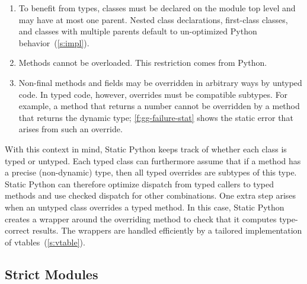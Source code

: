 \documentclass[english,cleveref,submission]{programming}
\newcommand{\SP}{Static Python}
\newcommand{\code}[1]{\texttt{#1}}
\begin{document}
\begin{enumerate}
  \item
    To benefit from types, classes must be declared on the module top level
    and may have at most one parent.
    Nested class declarations, first-class classes, and classes with
    multiple parents default to un-optimized Python behavior~(\cref{s:impl}).

  \item
    Methods cannot be overloaded.
    This restriction comes from Python.

  \item
    Non-final methods and fields may be overridden in arbitrary ways by untyped code.
    In typed code, however, overrides must be compatible subtypes.
    For example, a method that returns a number cannot be overridden by a method
    that returns the dynamic type; \cref{f:gg-failure-stat} shows the static error
    that arises from such an override.


\end{enumerate}
%
With this context in mind, \SP{} keeps track of whether each class is typed or untyped.
Each typed class can furthermore assume that if a method has a precise (non-dynamic)
type, then all typed overrides are subtypes of this type.
\SP{} can therefore optimize dispatch from typed callers to typed methods
and use checked dispatch for other combinations.
One extra step arises when an untyped class overrides a typed method.
In this case, \SP{} creates a wrapper around the overriding method to check
that it computes type-correct results.
The wrappers are handled efficiently by a tailored implementation of vtables~(\cref{s:vtable}).


\subsection{Strict Modules}
\label{s:strict-mod}

\end{document}
